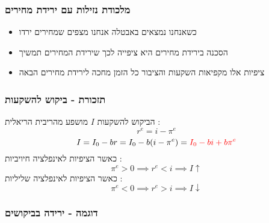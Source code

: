 \documentclass[usenames,dvipsnames]{beamer}
\begin{document}
\begin{RTL}
\begin{frame}
\begin{flushleft}
    \end{flushleft} 



\end{frame}

\begin{frame}
    \frametitle{מלכודת נזילות עם ירידת מחירים}
    \begin{itemize}
        \item כשאנחנו נמצאים באבטלה אנחנו מצפים שמחירים ירדו
        \item הסכנה בירידת מחירים היא ציפייה לכך שירידת המחירים תמשיך
        \item ציפיות אלו מקפיאות השקעות והציבור כל הזמן מחכה לירידת מחירים הבאה
    \end{itemize}

    

\end{frame}

\begin{frame}
    \frametitle{תזכורת - ביקוש להשקעות}
    הביקוש להשקעות $I$ מושפע מהריבית הריאלית :
    \begin{equation*}
        r^e = i - \pi^e
    \end{equation*}
    \begin{equation*}
        I = I_0 - br = I_0 - b(i - \pi^e) = \textcolor{red}{I_0 - bi + b\pi^e}
    \end{equation*}
    כאשר הציפיות לאינפלציה חיויביות : \\
    \begin{equation*}
        \pi^e > 0 \implies  r^e  < i \implies I \uparrow
    \end{equation*}
    כאשר הציפיות לאינפלציה שליליות : \\
    \begin{equation*}
        \pi^e < 0 \implies  r^e  > i \implies I \downarrow
    \end{equation*}
\end{frame}

\begin{frame}
    \frametitle{דוגמה - ירידה בביקושים}
    \begin{flushleft}
\end{flushleft}
\end{frame}
\end{RTL}
\end{document}
